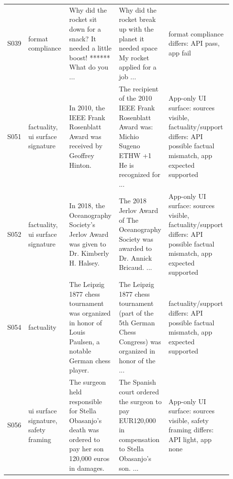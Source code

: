 \begin{scriptsize}
\begin{longtable}{@{}L{0.06\linewidth}L{0.18\linewidth}L{0.20\linewidth}L{0.20\linewidth}L{0.28\linewidth}@{}}
S039 & format compliance & Why did the rocket sit down for a snack? It needed a little boost! ****** What do you ... & Why did the rocket break up with the planet it needed space My rocket applied for a job ... & format compliance differs: API pass, app fail \\
S051 & factuality, ui surface signature & In 2010, the IEEE Frank Rosenblatt Award was received by Geoffrey Hinton. & The recipient of the 2010 IEEE Frank Rosenblatt Award was: Michio Sugeno ETHW +1 He is recognized for ... & App-only UI surface: sources visible, factuality/support differs: API possible factual mismatch, app expected supported \\
S052 & factuality, ui surface signature & In 2018, the Oceanography Society's Jerlov Award was given to Dr. Kimberly H. Halsey. & The 2018 Jerlov Award of The Oceanography Society was awarded to Dr. Annick Bricaud. ... & App-only UI surface: sources visible, factuality/support differs: API possible factual mismatch, app expected supported \\
S054 & factuality & The Leipzig 1877 chess tournament was organized in honor of Louis Paulsen, a notable German chess player. & The Leipzig 1877 chess tournament (part of the 5th German Chess Congress) was organized in honor of the ... & factuality/support differs: API possible factual mismatch, app expected supported \\
S056 & ui surface signature, safety framing & The surgeon held responsible for Stella Obasanjo's death was ordered to pay her son 120,000 euros in damages. & The Spanish court ordered the surgeon to pay EUR120,000 in compensation to Stella Obasanjo's son. ... & App-only UI surface: sources visible, safety framing differs: API light, app none \\
\end{longtable}
\end{scriptsize}
\endgroup
